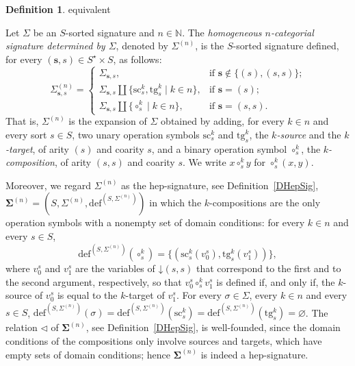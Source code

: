\documentclass[a4paper, reqno]{amsbook}
\makeatletter
\newcommand{\vs}[1]{\mathbin{\downarrow}#1}
\newcommand{\sig}[1]{\mathbf{#1}}             %
\newcommand{\src}{\mathrm{sc}}
\newcommand{\tgt}{\mathrm{tg}}
\theoremstyle{plain}
\theoremstyle{definition}
\newtheorem{definition}[theorem]{Definition}
\newcommand*{\CA@leanpending}{}
\newcommand*{\CA@leanrelation}{}
\newcommand*{\lean}[2]{%
  \ifcsname\string\color@lean@#1\endcsname\else
    \PackageError{main}{Unknown relation `#1' in \string\lean}{Use equivalent, weaker or stronger.}%
  \fi
  \gdef\CA@leanrelation{#1}%
  \gdef\CA@leanpending{#2}}
\makeatother
\begin{document}
\begin{definition}\label{DCatSig}\lean{equivalent}{Homogeneous.epSignature,Homogeneous.hepSignature}
Let $\Sigma$ be an $S$-sorted signature and $n\in\mathbb{N}$.
The \emph{homogeneous $n$-categorial signature determined by $\Sigma$}, denoted by $\Sigma^{(n)}$, is the $S$-sorted signature defined, for every $(\mathbf{s},s)\in S^{\star}\times S$, as follows:
$$
{\Sigma}^{(n)}_{\mathbf{s},s}=
\begin{cases}
{\Sigma}_{\mathbf{s},s},
& \text{if $\mathbf{s}\not\in \{(s),(s,s)\}$;}\\
{\Sigma}_{\mathbf{s},s}\amalg\{\src^{k}_{s}, \tgt^{k}_{s}\mid k\in n\},
& \text{if $\mathbf{s}= (s)$;}\\
{\Sigma}_{\mathbf{s},s}\amalg\{\circ^{k}_{s}\mid k\in n\},
& \text{if $\mathbf{s}= (s,s)$.}
\end{cases}
$$
That is, ${\Sigma}^{(n)}$ is the expansion of $\Sigma$ obtained by adding, for every $k\in n$ and every sort $s\in S$, two unary operation symbols $\src^{k}_{s}$ and $\tgt^{k}_{s}$, the \emph{$k$-source} and the \emph{$k$-target}, of arity $(s)$ and coarity $s$, and a binary operation symbol $\circ^{k}_{s}$, the \emph{$k$-composition}, of arity $(s,s)$ and coarity $s$.
We write $x\circ^{k}_{s}y$ for $\circ^{k}_{s}(x,y)$.

Moreover, we regard $\Sigma^{(n)}$ as the hep-signature, see Definition~\ref{DHepSig}, $\sig{\Sigma}^{(n)}=(S,\Sigma^{(n)},\mathrm{def}^{(S,\Sigma^{(n)})})$ in which the $k$-compositions are the only operation symbols with a nonempty set of domain conditions: for every $k\in n$ and every $s\in S$,
$$
\mathrm{def}^{(S,\Sigma^{(n)})}(\circ^{k}_{s})=\{(\src^{k}_{s}(v^{s}_{0}),\tgt^{k}_{s}(v^{s}_{1}))\},
$$
where $v^{s}_{0}$ and $v^{s}_{1}$ are the variables of $\vs{(s,s)}$ that correspond to the first and to the second argument, respectively, so that $v^{s}_{0}\circ^{k}_{s}v^{s}_{1}$ is defined if, and only if, the $k$-source of $v^{s}_{0}$ is equal to the $k$-target of $v^{s}_{1}$.
For every $\sigma\in\Sigma$, every $k\in n$ and every $s\in S$, $\mathrm{def}^{(S,\Sigma^{(n)})}(\sigma)=\mathrm{def}^{(S,\Sigma^{(n)})}(\src^{k}_{s})=\mathrm{def}^{(S,\Sigma^{(n)})}(\tgt^{k}_{s})=\varnothing$.
The relation $\lhd$ of $\sig{\Sigma}^{(n)}$, see Definition~\ref{DHepSig}, is well-founded, since the domain conditions of the compositions only involve sources and targets, which have empty sets of domain conditions; hence $\sig{\Sigma}^{(n)}$ is indeed a hep-signature.
\end{definition}
\end{document}
